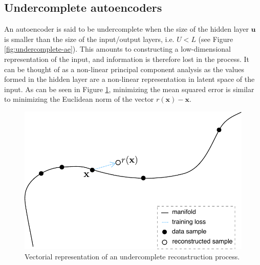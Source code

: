 \subsection*{Undercomplete autoencoders}
An autoencoder is said to be undercomplete when the size of the hidden layer $\mathbf{u}$ is smaller than the size of the input/output layers, i.e. $U < L$ (see Figure \ref{fig:undercomplete-ae}). This amounts to constructing a low-dimensional representation of the input, and information is therefore lost in the process. It can be thought of as a non-linear principal component analysis \citep{pca-ae-1, pca-ae-2} as the values formed in the hidden layer are a non-linear representation in latent space of the input. As can be seen in Figure \ref{fig:reconstruction}, minimizing the mean squared error is similar to minimizing the Euclidean norm of the vector $r(\mathbf{x}) - \mathbf{x}$.
\begin{figure}[!h]
\centering
\includegraphics[scale=0.55]{figures/reconstruction}
\caption[Vectorial representation of undercomplete AE]{Vectorial representation of an undercomplete reconstruction process.}
\label{fig:reconstruction}
\end{figure}

